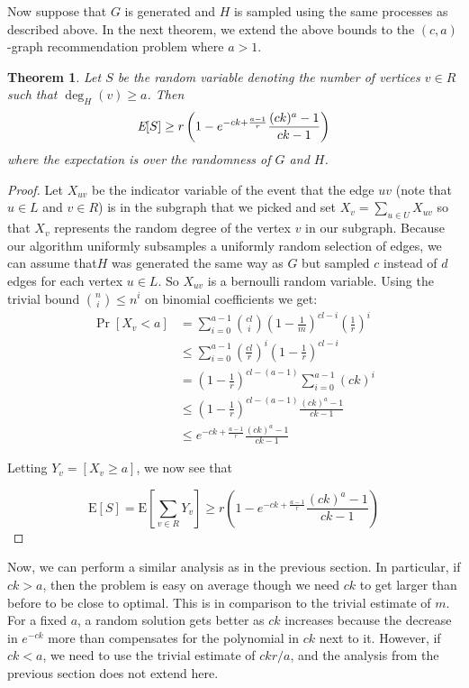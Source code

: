\documentclass[]{article}
\newcommand{\E}{\text{E}}
\newtheorem{thm}{Theorem}
\begin{document}
Now suppose that $G$ is generated and $H$ is sampled using the same
processes as described above. In the next theorem, we extend the above
bounds to the $(c,a)$-graph recommendation problem where $a>1$. 

\begin{thm}
Let $S$ be the random variable denoting the number of vertices $v \in R$ such that $\deg_{H}(v)\geq a$. Then
\[ \emph{\E}[S] \geq r\left(1-e^{-ck+\frac{a-1}{r}}\frac{(ck)^a-1}{ck-1}\right)  \]
where the expectation is over the randomness of $G$ and $H$.
\end{thm}

\begin{proof}
Let $X_{uv}$ be the indicator variable of the event that the edge $uv$
(note that $u\in L$ and $v\in R$) is in the subgraph that we picked
and set $X_{v} = \sum_{u\in U} X_{uv}$ so that $X_{v}$ represents the
random degree of the vertex $v$ in our subgraph. Because our algorithm
uniformly subsamples a uniformly random selection of edges, we can
assume that$H$ was generated the same way as $G$ but sampled $c$
instead of $d$ edges for each vertex $u\in L$. So $X_{uv}$ is a
bernoulli random variable. Using the trivial bound $\binom{n}{i}
\leq n^i$ on binomial coefficients we get:
\begin{align*}
      \Pr[X_v < a]
&=    \sum_{i=0}^{a-1} \binom{cl}{i} \left(1-\frac{1}{m}\right)^{cl-i}\left(\frac{1}{r}\right)^i \\
&\leq \sum_{i=0}^{a-1} \left(\frac{cl}{r}\right)^i\left(1-\frac{1}{r}\right)^{cl-i} \\
&=    \left(1-\frac{1}{r}\right)^{cl-(a-1)}\sum_{i=0}^{a-1} (ck)^i \\
&\leq \left(1-\frac{1}{r}\right)^{cl-(a-1)}\frac{(ck)^a-1}{ck-1} \\
&\leq e^{-ck+\frac{a-1}{r}} \frac{(ck)^a-1}{ck-1}
\end{align*}


Letting $Y_v = \left[X_v \geq a\right]$, we now see that

\[ \E[S] = \E\left[\sum_{v\in R} Y_v\right] \geq r\left(1-e^{-ck+\frac{a-1}{r}} \frac{(ck)^a-1}{ck-1}\right) \]
\end{proof}

Now, we can perform a similar analysis as in the previous section. In
particular, if $ck>a$, then the problem is easy on average though we
need $ck$ to get larger than before to be close to optimal. This
is in comparison to the trivial estimate of $m$. For a fixed $a$, a
random solution gets better as $ck$ increases because the decrease in
$e^{-ck}$ more than compensates for the polynomial in $ck$ next to
it. However, if $ck<a$, we need to use the trivial estimate of
$ckr/a$, and the analysis from the previous section does not extend
here. \\
\end{document}
